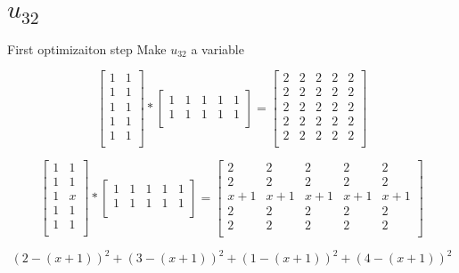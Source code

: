 \documentclass{report}
\begin{document}
\section{$u_{32}$}

First optimizaiton step
Make $u_{32}$ a variable

\[
  \begin{bmatrix}
    1 & 1 \\
    1 & 1 \\
    1 & 1 \\
    1 & 1 \\
    1 & 1 \\
  \end{bmatrix}
  * 
  \begin{bmatrix}
    1 & 1 & 1 & 1 & 1 \\
    1 & 1 & 1 & 1 & 1 \\
  \end{bmatrix}
  =
  \begin{bmatrix}
    2 & 2 & 2 & 2 & 2 \\
    2 & 2 & 2 & 2 & 2 \\
    2 & 2 & 2 & 2 & 2 \\
    2 & 2 & 2 & 2 & 2 \\
    2 & 2 & 2 & 2 & 2 \\
  \end{bmatrix}
\]

\[
  \begin{bmatrix}
    1 & 1 \\
    1 & 1 \\
    1 & x \\
    1 & 1 \\
    1 & 1 \\
  \end{bmatrix}
  * 
  \begin{bmatrix}
    1 & 1 & 1 & 1 & 1 \\
    1 & 1 & 1 & 1 & 1 \\
  \end{bmatrix}
  =
  \begin{bmatrix}
    2   & 2   & 2   & 2   & 2   \\
    2   & 2   & 2   & 2   & 2   \\
    x+1 & x+1 & x+1 & x+1 & x+1 \\
    2   & 2   & 2   & 2   & 2   \\
    2   & 2   & 2   & 2   & 2   \\
  \end{bmatrix}
\]

\begin{equation}
(2-(x+1))^{2}+(3-(x+1))^{2}+(1-(x+1))^{2}+(4-(x+1))^{2}
\end{equation}
\end{document}
